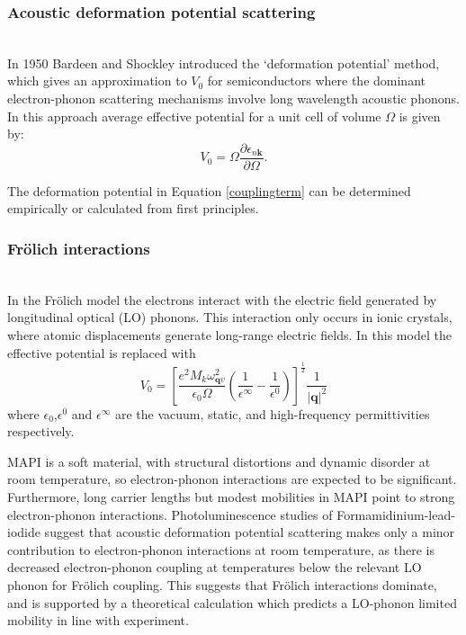 \subsubsection{Acoustic deformation potential scattering}\\
 In 1950 Bardeen and Shockley introduced the `deformation potential' method,\autocite{Bardeen1950} which gives an approximation to $V_0$ for semiconductors where the dominant electron-phonon scattering mechanisms involve long wavelength acoustic phonons.\autocite{Giustino2017} In this approach average effective potential for a unit cell of volume $\Omega$ is given by:
\begin{equation} \label{couplingterm} 
   V_0 = \Omega\frac{\partial\epsilon_{n\textbf{k}}}{\partial\Omega}.
\end{equation}

The deformation potential in Equation \ref{couplingterm} can be determined empirically or calculated from first principles. 

\subsubsection{Fr\"{o}lich interactions}\\
In the Fr\"{o}lich model the electrons interact with the electric field generated by longitudinal optical (LO) phonons.
This interaction only occurs in ionic crystals, where atomic displacements generate long-range electric fields.
In this model the effective potential is replaced with
\begin{equation}
    V_0 = \left[\frac{e^2M_k\omega^2_{\textbf{q}v}}{\epsilon_0\Omega}\left(\frac{1}{\epsilon^{\infty}}-\frac{1}{\epsilon^0}\right)\right]^{\frac{1}{2}}\frac{1}{|\textbf{q}|^2}
\end{equation}
where $\epsilon_0$,$\epsilon^0$ and $\epsilon^{\infty}$ are the vacuum, static, and high-frequency permittivities respectively.

MAPI is a soft material, with structural distortions and dynamic disorder at room temperature, so electron-phonon interactions are expected to be significant.
Furthermore, long carrier lengths but modest mobilities in MAPI point to strong electron-phonon interactions.\autocite{Brenner2015} 
Photoluminescence studies of Formamidinium-lead-iodide suggest that acoustic deformation potential scattering makes only a minor contribution to electron-phonon interactions at room temperature,\autocite{Wright2016}
as there is decreased electron-phonon coupling at temperatures below the relevant LO phonon for Fr\"{o}lich coupling. This suggests that Fr\"{o}lich interactions dominate, and is supported by a theoretical calculation which predicts a LO-phonon limited mobility in line with experiment.\autocite{Frost2017b}

